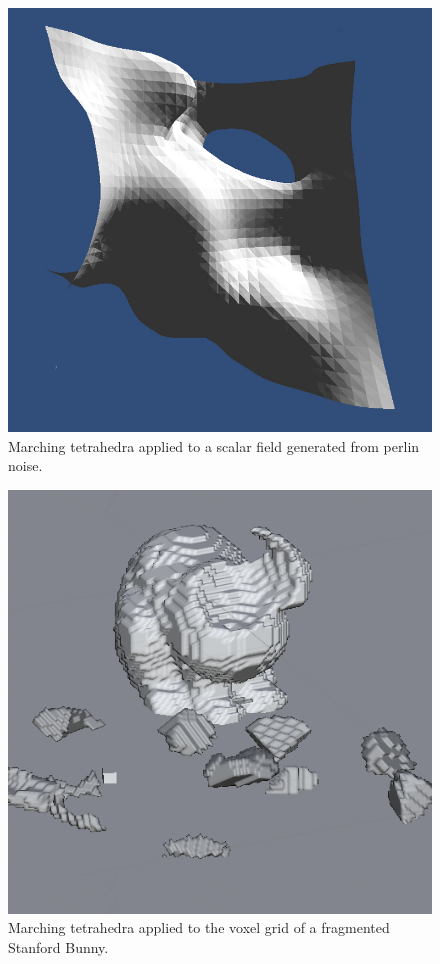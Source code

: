 \begin{figure}[b!]
\centerline{\includegraphics[scale=8]{marchingtetrahedrons.jpg}}
\caption{Marching tetrahedra applied to a scalar field generated from perlin noise\cite{ScrawkMarching}.}
\label{fig:3.9}
\end{figure}
\begin{figure}
\centerline{\includegraphics[scale=0.75]{Marching.png}}
\caption{Marching tetrahedra applied to the voxel grid of a fragmented Stanford Bunny.}
\label{fig:3.10}
\end{figure}

